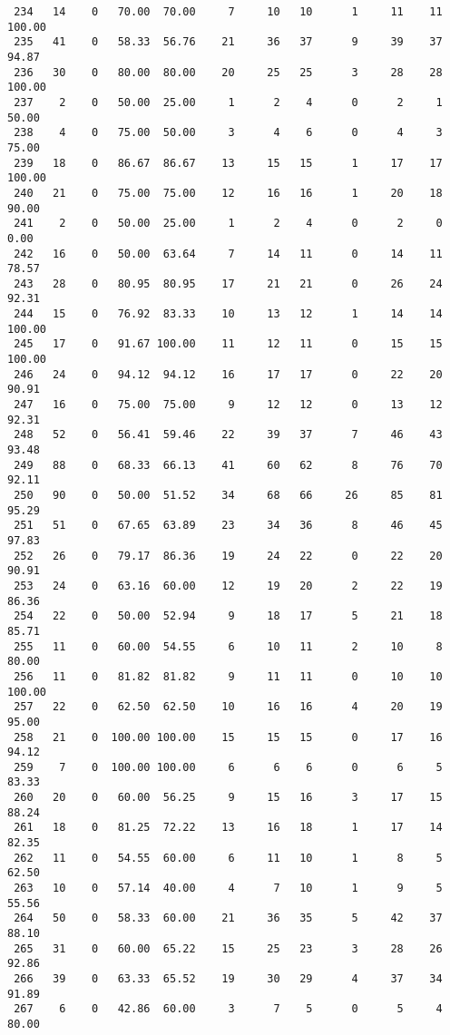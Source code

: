 \begin{verbatim}
 234   14    0   70.00  70.00     7     10   10      1     11    11   100.00
 235   41    0   58.33  56.76    21     36   37      9     39    37    94.87
 236   30    0   80.00  80.00    20     25   25      3     28    28   100.00
 237    2    0   50.00  25.00     1      2    4      0      2     1    50.00
 238    4    0   75.00  50.00     3      4    6      0      4     3    75.00
 239   18    0   86.67  86.67    13     15   15      1     17    17   100.00
 240   21    0   75.00  75.00    12     16   16      1     20    18    90.00
 241    2    0   50.00  25.00     1      2    4      0      2     0     0.00
 242   16    0   50.00  63.64     7     14   11      0     14    11    78.57
 243   28    0   80.95  80.95    17     21   21      0     26    24    92.31
 244   15    0   76.92  83.33    10     13   12      1     14    14   100.00
 245   17    0   91.67 100.00    11     12   11      0     15    15   100.00
 246   24    0   94.12  94.12    16     17   17      0     22    20    90.91
 247   16    0   75.00  75.00     9     12   12      0     13    12    92.31
 248   52    0   56.41  59.46    22     39   37      7     46    43    93.48
 249   88    0   68.33  66.13    41     60   62      8     76    70    92.11
 250   90    0   50.00  51.52    34     68   66     26     85    81    95.29
 251   51    0   67.65  63.89    23     34   36      8     46    45    97.83
 252   26    0   79.17  86.36    19     24   22      0     22    20    90.91
 253   24    0   63.16  60.00    12     19   20      2     22    19    86.36
 254   22    0   50.00  52.94     9     18   17      5     21    18    85.71
 255   11    0   60.00  54.55     6     10   11      2     10     8    80.00
 256   11    0   81.82  81.82     9     11   11      0     10    10   100.00
 257   22    0   62.50  62.50    10     16   16      4     20    19    95.00
 258   21    0  100.00 100.00    15     15   15      0     17    16    94.12
 259    7    0  100.00 100.00     6      6    6      0      6     5    83.33
 260   20    0   60.00  56.25     9     15   16      3     17    15    88.24
 261   18    0   81.25  72.22    13     16   18      1     17    14    82.35
 262   11    0   54.55  60.00     6     11   10      1      8     5    62.50
 263   10    0   57.14  40.00     4      7   10      1      9     5    55.56
 264   50    0   58.33  60.00    21     36   35      5     42    37    88.10
 265   31    0   60.00  65.22    15     25   23      3     28    26    92.86
 266   39    0   63.33  65.52    19     30   29      4     37    34    91.89
 267    6    0   42.86  60.00     3      7    5      0      5     4    80.00

\end{verbatim}
